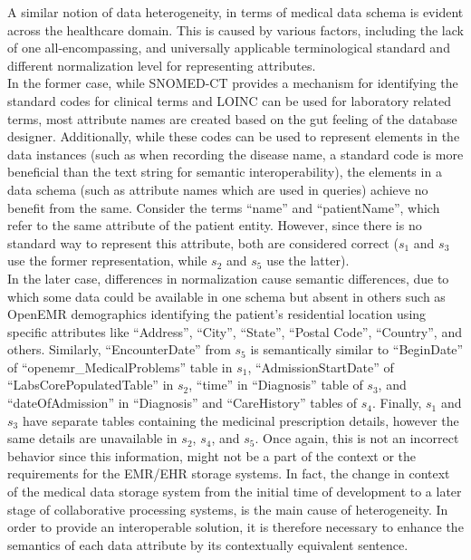 \documentclass{ieeeaccess}
\begin{document}
A similar notion of data heterogeneity, in terms of medical data schema is evident across the healthcare domain. This is caused by various factors, including the lack of one all-encompassing, and universally applicable terminological standard and different normalization level for representing attributes.\\
In the former case, while SNOMED-CT provides a mechanism for identifying the standard codes for clinical terms and LOINC can be used for laboratory related terms, most attribute names are created based on the gut feeling of the database designer. Additionally, while these codes can be used to represent elements in the data instances (such as when recording the disease name, a standard code is more beneficial than the text string for semantic interoperability), the elements in a data schema (such as attribute names which are used in queries) achieve no benefit from the same.  Consider the terms ``name'' and ``patientName'', which refer to the same attribute of the patient entity.  However, since there is no standard way to represent this attribute, both are considered correct ($s_1$ and $s_3$ use the former representation, while $s_2$ and $s_5$ use the latter).\\
In the later case, differences in normalization cause semantic differences, due to which some data could be available in one schema but absent in others such as OpenEMR demographics identifying the patient's residential location using specific attributes like ``Address'', ``City'', ``State'', ``Postal Code'', ``Country'', and others. Similarly, ``EncounterDate'' from $s_5$ is semantically similar to ``BeginDate'' of ``openemr\_MedicalProblems'' table in $s_1$, ``AdmissionStartDate'' of ``LabsCorePopulatedTable'' in $s_2$, 
``time'' in ``Diagnosis'' table of $s_3$, and  ``dateOfAdmission'' in ``Diagnosis'' and ``CareHistory'' tables of $s_4$.
Finally, $s_1$ and $s_3$ have separate tables containing the medicinal prescription details, however the same details are unavailable in $s_2$, $s_4$, and $s_5$. Once again, this is not an incorrect behavior since this information, might not be a part of the context or the requirements for the EMR/EHR storage systems.
In fact, the change in context of the medical data storage system from the initial time of development to a later stage of collaborative processing systems, is the main cause of heterogeneity. In order to provide an interoperable solution, it is therefore necessary to enhance the semantics of each data attribute by its contextually equivalent sentence. 
\end{document}
